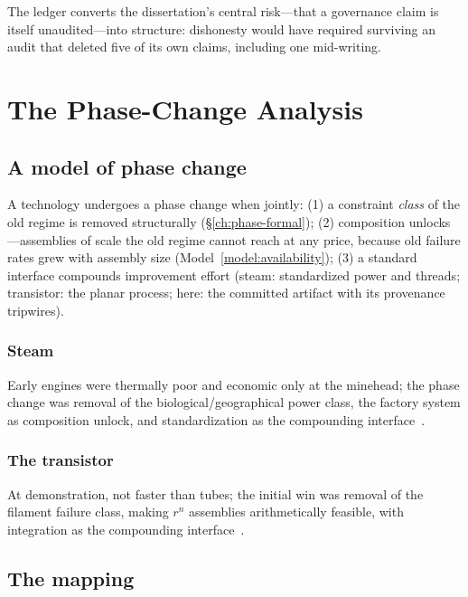 \documentclass[12pt,oneside]{report}
\theoremstyle{plain}
\theoremstyle{definition}
\theoremstyle{remark}
\begin{document}
The ledger converts the dissertation's central risk---that a
governance claim is itself unaudited---into structure: dishonesty would
have required surviving an audit that deleted five of its own claims,
including one mid-writing.

\chapter{The Phase-Change Analysis}
\label{ch:phase}

\section{A model of phase change}

A technology undergoes a phase change when jointly: (1) a constraint
\emph{class} of the old regime is removed structurally
(\S\ref{ch:phase-formal}); (2) composition unlocks---assemblies of
scale the old regime cannot reach at any price, because old failure
rates grew with assembly size (Model~\ref{model:availability});
(3) a standard interface compounds improvement effort (steam:
standardized power and threads; transistor: the planar process; here:
the committed artifact with its provenance tripwires).

\subsection{Steam}
Early engines were thermally poor and economic only at the minehead;
the phase change was removal of the biological/geographical power
class, the factory system as composition unlock, and standardization
as the compounding interface~\cite{landes1969,rosenberg1976}.

\subsection{The transistor}
At demonstration, not faster than tubes; the initial win was removal
of the filament failure class, making $r^n$ assemblies
arithmetically feasible, with integration as the compounding
interface~\cite{bardeen1948,moore1965}.

\section{The mapping}
\end{document}
